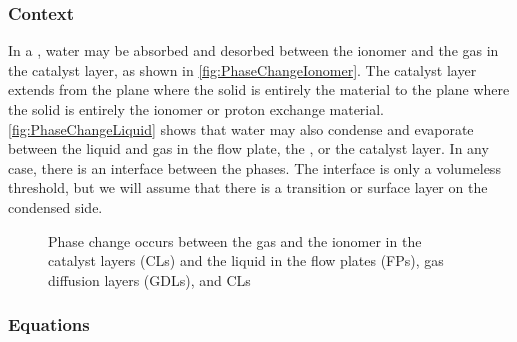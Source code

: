 \subsubsection{Context}

In a , water may be absorbed and desorbed between the ionomer and the gas in the catalyst layer, as shown in \autoref{fig:PhaseChangeIonomer}.  The catalyst layer extends from the plane where the solid is entirely the  material to the plane where the solid is entirely the ionomer or proton exchange material.  \autoref{fig:PhaseChangeLiquid} shows that water may also condense and evaporate between the liquid and gas in the flow plate, the , or the catalyst layer.  In any case, there is an interface between the phases.  The interface is only a volumeless threshold, but we will assume that there is a transition or surface layer on the condensed side.

\begin{figure}[htbp]
  \quad
  \caption[Locations of the phase change processes]{Phase change occurs between the gas and  the ionomer in the catalyst layers (CLs) and  the liquid in the flow plates (FPs), gas diffusion layers (GDLs), and CLs}
  \label{fig:PhaseChangeContext}
\end{figure}


\subsubsection{Equations}


